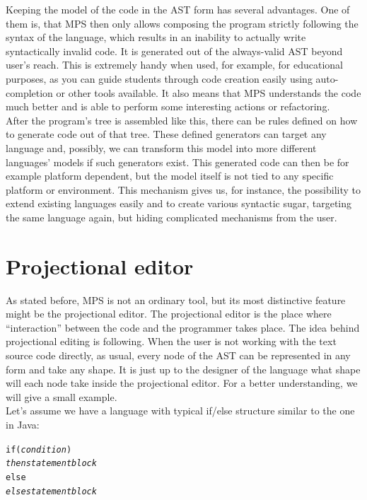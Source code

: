 Keeping the model of the code in the AST form has several advantages.
One of them is, that  MPS then only allows composing the program strictly following the syntax of the language, which results in an inability to actually write syntactically invalid code.
It is generated out of the always-valid AST beyond user's reach.
This is extremely handy when used, for example, for educational purposes, as you can guide students through code creation easily using auto-completion or other tools available.
It also means that MPS understands the code much better and is able to perform some interesting actions or refactoring.
\\

After the program's tree is assembled like this, there can be rules defined on how to generate code out of that tree.
These defined generators can target any language and, possibly, we can transform this model into more different languages' models if such generators exist.
This generated code can then be for example platform dependent, but the model itself is not tied to any specific platform or environment.
This mechanism gives us, for instance, the possibility to extend existing languages easily and to create various syntactic sugar, targeting the same language again, but hiding complicated mechanisms from the user.

\section{Projectional editor}
As stated before, MPS is not an ordinary tool, but its most distinctive feature might be the projectional editor.
The projectional editor is the place where “interaction” between the code and the programmer takes place.
The idea behind projectional editing is following.
When the user is not working with the text source code directly, as usual, every node of the AST can be represented in any form and take any shape.
It is just up to the designer of the language what shape will each node take inside the projectional editor.
For a better understanding, we will give a small example.
\\

Let's assume we have a language with typical if/else structure similar to the one in Java:

\begin{center}
	\begin{minipage}{.38\textwidth}
		\begin{alltt}
			if (\textit{condition})
			    \textit{then statement block}
			else
			    \textit{else statement block}
		\end{alltt}
	\end{minipage}
\end{center}

